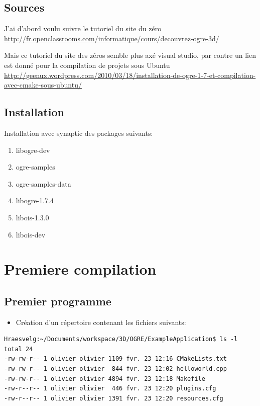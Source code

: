 \documentclass[10pt,a4paper]{report}
\begin{document}
\section{Sources}
J'ai d'abord voulu suivre le tutoriel du site du z\'ero
\url{http://fr.openclassrooms.com/informatique/cours/decouvrez-ogre-3d/}\newline

Mais ce tutoriel du site des z\'eros semble plus ax\'e visual studio, par contre un lien est donn\'e pour la compilation de projets sous Ubuntu \url{http://geenux.wordpress.com/2010/03/18/installation-de-ogre-1-7-et-compilation-avec-cmake-sous-ubuntu/}


\section{Installation}
Installation avec synaptic des packages suivants:
\begin{enumerate}
\item libogre-dev
\item ogre-samples
\item ogre-samples-data
\item libogre-1.7.4
\item libois-1.3.0
\item libois-dev 
\end{enumerate}






\chapter{Premiere compilation}

\section{Premier programme}

\begin{itemize}
\item Cr\'eation d'un r\'epertoire contenant les fichiers suivants:
\end{itemize}

\begin{lstlisting}
Hraesvelg:~/Documents/workspace/3D/OGRE/ExampleApplication$ ls -l
total 24
-rw-rw-r-- 1 olivier olivier 1109 fvr. 23 12:16 CMakeLists.txt
-rw-rw-r-- 1 olivier olivier  844 fvr. 23 12:02 helloworld.cpp
-rw-rw-r-- 1 olivier olivier 4894 fvr. 23 12:18 Makefile
-rw-r--r-- 1 olivier olivier  446 fvr. 23 12:20 plugins.cfg
-rw-r--r-- 1 olivier olivier 1391 fvr. 23 12:20 resources.cfg
\end{lstlisting}
\end{document}
